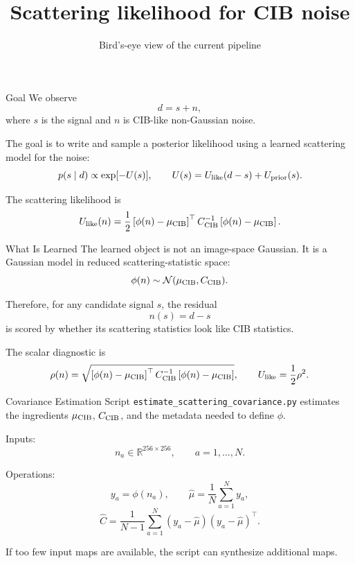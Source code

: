 \documentclass[aspectratio=169]{beamer}
\title[Scattering likelihood]{Scattering likelihood for CIB noise}
\subtitle{Bird's-eye view of the current pipeline}
\author{}
\date{}
\newcommand{\ph}{\phi}
\newcommand{\mucib}{\mu_{\rm CIB}}
\newcommand{\Ccib}{C_{\rm CIB}}
\newcommand{\Ulike}{U_{\rm like}}
\newcommand{\Uprior}{U_{\rm prior}}
\begin{document}
\begin{frame}
  \titlepage
\end{frame}

\begin{frame}{Goal}
  We observe
  \[
    d = s + n,
  \]
  where \(s\) is the signal and \(n\) is CIB-like non-Gaussian noise.

  \vspace{0.4cm}
  The goal is to write and sample a posterior likelihood using a learned
  scattering model for the noise:
  \[
    p(s\mid d)
    \propto
    \exp[-U(s)],
    \qquad
    U(s)
    =
    \Ulike(d-s)
    +
    \Uprior(s).
  \]

  \vspace{0.3cm}
  The scattering likelihood is
  \[
    \Ulike(n)
    =
    \frac12
    \left[\ph(n)-\mucib\right]^{\top}
    \Ccib^{-1}
    \left[\ph(n)-\mucib\right].
  \]
\end{frame}

\begin{frame}{What Is Learned}
  The learned object is not an image-space Gaussian. It is a Gaussian model
  in reduced scattering-statistic space:
  \[
    \ph(n) \sim \mathcal{N}(\mucib,\Ccib).
  \]

  \vspace{0.35cm}
  Therefore, for any candidate signal \(s\), the residual
  \[
    n(s)=d-s
  \]
  is scored by whether its scattering statistics look like CIB statistics.

  \vspace{0.35cm}
  The scalar diagnostic is
  \[
    \rho(n)
    =
    \sqrt{
    \left[\ph(n)-\mucib\right]^{\top}
    \Ccib^{-1}
    \left[\ph(n)-\mucib\right]
    },
    \qquad
    \Ulike=\frac12\rho^2.
  \]
\end{frame}

\begin{frame}{Covariance Estimation Script}
  \texttt{estimate\_scattering\_covariance.py} estimates the ingredients
  \(\mucib\), \(\Ccib\), and the metadata needed to define \(\ph\).

  \vspace{0.3cm}
  Inputs:
  \[
    n_a \in \mathbb{R}^{256\times256},
    \qquad a=1,\ldots,N.
  \]

  Operations:
  \[
    y_a = \ph(n_a),
    \qquad
    \widehat{\mu}
    =
    \frac1N\sum_{a=1}^{N} y_a,
  \]
  \[
    \widehat{C}
    =
    \frac{1}{N-1}
    \sum_{a=1}^{N}
    (y_a-\widehat{\mu})(y_a-\widehat{\mu})^{\top}.
  \]

  \vspace{0.25cm}
  If too few input maps are available, the script can synthesize additional
  maps.
\end{frame}
\end{document}
